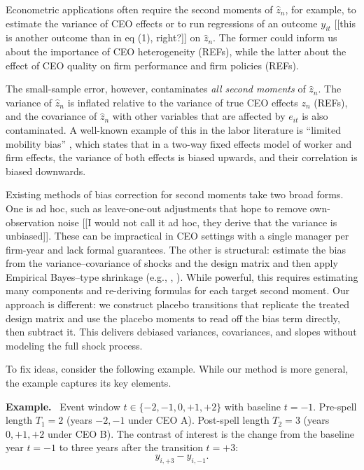 \documentclass[11pt,a4paper]{article}
\begin{document}
Econometric applications often require the second moments of $\hat z_n$, for example, to estimate the variance of CEO effects or to run regressions of an outcome $y_{it}$ [[this is another outcome than in eq (1), right?]] on $\hat z_n$. The former could inform us about the importance of CEO heterogeneity (REFs), while the latter about the effect of CEO quality on firm performance and firm policies (REFs). 

The small-sample error, however, contaminates \emph{all second moments} of $\hat z_n$. The variance of $\hat z_n$ is inflated relative to the variance of true CEO effects $z_n$ (REFs), and the covariance of $\hat z_n$ with other variables that are affected by $e_{it}$ is also contaminated. A well-known example of this in the labor literature is ``limited mobility bias'' \citep{andrews2008high}, which states that in a two-way fixed effects model of worker and firm effects, the variance of both effects is biased upwards, and their correlation is biased downwards.

Existing methods of bias correction for second moments take two broad forms. One is ad hoc, such as leave-one-out adjustments that hope to remove own-observation noise \citep{kline2020leave} [[I would not call it ad hoc, they derive that the variance is unbiased]]. These can be impractical in CEO settings with a single manager per firm-year and lack formal guarantees. The other is structural: estimate the bias from the variance–covariance of shocks and the design matrix and then apply Empirical Bayes–type shrinkage (e.g., \citealt{andrews2008high}, \citealt{Bonhomme2023-dx}). While powerful, this requires estimating many components and re-deriving formulas for each target second moment. Our approach is different: we construct placebo transitions that replicate the treated design matrix and use the placebo moments to read off the bias term directly, then subtract it. This delivers debiased variances, covariances, and slopes without modeling the full shock process.


\newenvironment{example}{\par\noindent\textbf{Example.}\ }{\par}

To fix ideas, consider the following example. While our method is more general, the example captures its key elements.
\begin{example}
Event window $t\in\{-2,-1,0,+1,+2\}$ with baseline $t=-1$. Pre-spell length $T_1=2$ (years $-2,-1$ under CEO A). Post-spell length $T_2=3$ (years $0, +1,+2$ under CEO B). The contrast of interest is the change from the baseline year $t=-1$ to three years after the transition $t=+3$:
\[
y_{i,+3} - y_{i,-1}.
\]
\end{example}
\end{document}
